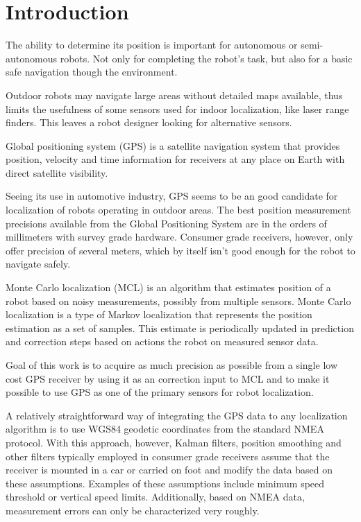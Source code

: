 \chapter{Introduction}


The ability to determine its position is important for autonomous or semi-autonomous robots.
Not only for completing the robot's task, but also for a basic
safe navigation though the environment.

Outdoor robots may navigate large areas without detailed maps available, thus limits
the usefulness of some sensors used for indoor localization, like laser range finders.
This leaves a robot designer looking for alternative sensors.

Global positioning system (GPS) is a satellite navigation system that
provides position, velocity and time information for receivers at any place on Earth with direct
satellite visibility.

Seeing its use in automotive industry, GPS seems to be an good candidate for
localization of robots operating in outdoor areas.
The best position measurement precisions available from the Global Positioning System
are in the orders of millimeters with survey grade hardware.
Consumer grade receivers, however, only offer precision of several meters, which
by itself isn't good enough for the robot to navigate safely.


Monte Carlo localization (MCL) is an algorithm that estimates position of a robot
based on noisy measurements, possibly from multiple sensors.
Monte Carlo localization is a type of Markov localization that represents the position estimation as
a set of samples.
This estimate is periodically updated in prediction and correction steps based on
actions the robot on measured sensor data.


\vspace{1.5em}

Goal of this work is to acquire as much precision as possible from a single low cost
GPS receiver by using it as an correction input to MCL and to make it possible to use
GPS as one of the primary sensors for robot localization.

A relatively straightforward way of integrating the GPS data to any localization algorithm is
to use WGS84 geodetic coordinates from the standard NMEA protocol.
With this approach, however, Kalman filters, position smoothing and other filters typically
employed in  consumer grade receivers assume that the receiver is mounted in a car or carried on foot
and modify the data based on these assumptions.
Examples of these assumptions include minimum speed threshold or vertical speed limits.
Additionally, based on NMEA data, measurement errors can only be characterized very roughly.

